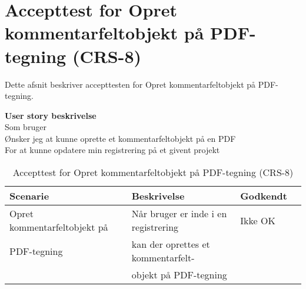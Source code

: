 \section{Accepttest for Opret kommentarfeltobjekt på PDF-tegning (CRS-8)}
Dette afsnit beskriver accepttesten for Opret kommentarfeltobjekt på PDF-tegning.

\textbf{User story beskrivelse} \\
Som bruger \\
Ønsker jeg at kunne oprette et kommentarfeltobjekt på en PDF \\
For at kunne opdatere min registrering på et givent projekt

\begin{table}[H]
	\centering
	\begin{tabular}{|ll|l|ll|} \hline
		\textbf{Scenarie} &  & \textbf{Beskrivelse}&  \textbf{Godkendt}&  \\ \hline
		Opret kommentarfeltobjekt på&  &  Når bruger er inde i en registrering &  Ikke OK&  \\
		PDF-tegning& & kan der oprettes et kommentarfelt- & & \\ 
		& & objekt på PDF-tegning& & \\ \hline
	\end{tabular}
	\caption{Accepttest for Opret kommentarfeltobjekt på PDF-tegning (CRS-8)}
	\label{AcceptKommentarfelt}
\end{table}

\clearpage
